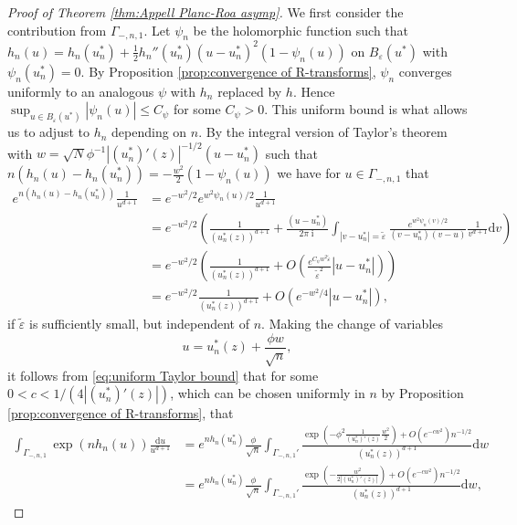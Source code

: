 \documentclass[reqno]{amsart}
\newcommand{\1}{\mathbf{1}}
\newcommand{\dd}{\mathrm{d}}
\DeclareMathOperator{\ii}{i}
\newcommand{\eps}{\varepsilon}
\theoremstyle{plain}
\theoremstyle{definition}
\theoremstyle{remark}
\numberwithin{equation}{section}
\begin{document}
\begin{proof}[Proof of Theorem \ref{thm:Appell Planc-Roa asymp}]
		We first consider the contribution from $\Gamma_{-,n,1}$. Let $\psi_n$ be the holomorphic function such that $h_n(u)=h_{n}(u_n^*)+\frac{1}{2}h_n''(u_n^*)(u-u_n^*)^2(1-\psi_n(u))$ on $B_{\eps}(u^*)$ with $\psi_n(u_n^*)=0$. By Proposition \ref{prop:convergence of R-transforms}, $\psi_n$ converges uniformly to an analogous $\psi$ with $h_n$ replaced by $h$. Hence $\sup_{u\in B_{\eps}(u^*)}|\psi_n(u)|\leq C_{\psi}$ for some $C_{\psi}>0$. This uniform bound is what allows us to adjust \cite{OSullivan2019} to $h_n$ depending on $n$.  By the integral version of Taylor's theorem \cite[Chapter 3.1, Theorem 8]{ahlfors} with $w=\sqrt{N}\phi^{-1}|(u_{n}^*)'(z)|^{-1/2}(u-u_n^*)$ such that $n(h_n(u)-h_n(u_n^*))=-\frac{w^2}{2}(1-\psi_n(u))$ we have for $u\in\Gamma_{-,n,1}$ that \begin{equation}\label{eq:uniform Taylor bound}
			\begin{aligned}
				e^{n(h_n(u) -h_{n}(u_n^*))}\frac{1}{u^{d+1}}&=e^{-w^2/2}e^{w^2\psi_n(u)/2}\frac{1}{u^{d+1}}\\
				&=e^{-w^2/2}\left(\frac{1}{(u_n^*(z))^{d+1}}+ \frac{(u-u_{n}^*)}{2\pi\ii}\int_{|v-u_n^*|=\tilde{\eps}}\frac{e^{w^2\psi_n(v)/2}}{(v-u_n^*)(v-u)}\frac{1}{v^{d+1}}\dd v \right)\\
				&=e^{-w^2/2}\left(\frac{1}{(u_n^*(z))^{d+1}}+ O\left(\frac{e^{C_{\psi}w^2\tilde\eps} }{\tilde{\eps}^2}|u-u_n^*|\right)\right)\\
				&=e^{-w^2/2}\frac{1}{(u_n^*(z))^{d+1}}+O(e^{-w^2/4}|u-u_n^*|),
			\end{aligned} 
		\end{equation} if $\tilde{\eps}$ is sufficiently small, but independent of $n$. Making the change of variables \begin{equation}
		u=u_n^*(z)+\frac{\phi w}{\sqrt{n}}, 
		\end{equation}
		  it follows from \eqref{eq:uniform Taylor bound} that for some $0<c<1/(4|(u_n^*)'(z)|)$, which can be chosen uniformly in $n$ by Proposition \ref{prop:convergence of R-transforms}, that
		  \begin{equation}\label{eq:Gamma_1 change of variables}
		\begin{aligned}
			\int_{\Gamma_{-,n,1}}\exp(nh_{n}(u))\frac{\dd u}{u^{d+1}}&=e^{nh_{n}(u_n^*)}\frac{\phi}{\sqrt{n}}\int_{\Gamma_{-,n,1}'}\frac{\exp\left(-\phi^2\frac{1}{(u_n^*)'\left(z\right)}\frac{w^2}{2}\right)+O(e^{-cw^2})n^{-1/2}}{\left(u_n^*(z) \right)^{d+1}} {\dd w}\\
			&=e^{nh_{n}(u_n^*)}\frac{\phi}{\sqrt{n}}\int_{\Gamma_{-,n,1}'}\frac{\exp\left(-\frac{w^2}{2|(u_n^*)'\left(z\right)|}\right)+O(e^{-cw^2})n^{-1/2}}{\left(u_n^*(z)\right)^{d+1}} \dd w, 	

\end{aligned}
\end{equation}
\end{proof}
\end{document}
